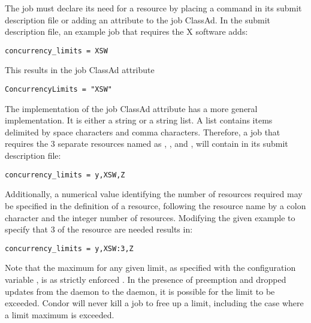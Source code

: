The job must declare its need for a resource by placing a command
in its submit description file or adding an attribute to the
job ClassAd.
In the submit description file, an example job that requires
the X software adds:
\begin{verbatim}
concurrency_limits = XSW
\end{verbatim}
This results in the job ClassAd attribute
\begin{verbatim}
ConcurrencyLimits = "XSW"
\end{verbatim}

The implementation of the job ClassAd attribute 
has a more general implementation.
It is either a string or a string list.
A list contains items delimited by space characters and comma characters.
Therefore, a job that requires the 3 separate resources 
named as  , , and  , 
will contain in its submit description file:
\begin{verbatim}
concurrency_limits = y,XSW,Z
\end{verbatim}

Additionally, a numerical value identifying the number of resources
required may be specified in the definition of a resource,
following the resource name by a colon character and the integer
number of resources.
Modifying the given example to specify that 3 of 
the  resource are needed results in: 
\begin{verbatim}
concurrency_limits = y,XSW:3,Z
\end{verbatim}

Note that the maximum for any given limit,
as specified with the configuration variable ,
is as strictly enforced .
In the presence of preemption and dropped updates from
the  daemon to the  daemon,
it is possible for the limit to be exceeded.
Condor will never kill a job to free up a limit,
including the case where a limit maximum is exceeded. 

